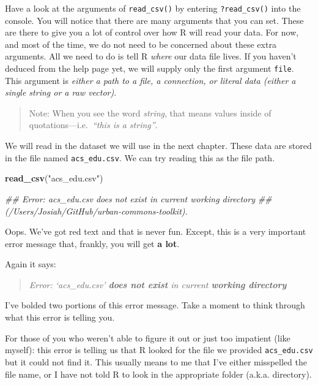 \documentclass[
]{book}
\newenvironment{Shaded}{\begin{snugshade}}{\end{snugshade}}
\newcommand{\CommentTok}[1]{\textcolor[rgb]{0.56,0.35,0.01}{\textit{#1}}}
\newcommand{\KeywordTok}[1]{\textcolor[rgb]{0.13,0.29,0.53}{\textbf{#1}}}
\newcommand{\NormalTok}[1]{#1}
\newcommand{\StringTok}[1]{\textcolor[rgb]{0.31,0.60,0.02}{#1}}
\begin{document}
Have a look at the arguments of \texttt{read\_csv()} by entering \texttt{?read\_csv()} into the console. You will notice that there are many arguments that you can set. These are there to give you a lot of control over how R will read your data. For now, and most of the time, we do not need to be concerned about these extra arguments. All we need to do is tell R \emph{where} our data file lives. If you haven't deduced from the help page yet, we will supply only the first argument \texttt{file}. This argument is \emph{either a path to a file, a connection, or literal data (either a single string or a raw vector)}.

\begin{quote}
Note: When you see the word \emph{string}, that means values inside of quotations---i.e.~\emph{``this is a string''}.
\end{quote}

We will read in the dataset we will use in the next chapter. These data are stored in the file named \texttt{acs\_edu.csv}. We can try reading this as the file path.

\begin{Shaded}
\begin{Highlighting}[]
\KeywordTok{read\_csv}\NormalTok{(}\StringTok{"acs\_edu.csv"}\NormalTok{)}

\CommentTok{\#\# Error: \textquotesingle{}acs\_edu.csv\textquotesingle{} does not exist in current working directory }
\CommentTok{\#\#   (\textquotesingle{}/Users/Josiah/GitHub/urban{-}commons{-}toolkit\textquotesingle{}).}
\end{Highlighting}
\end{Shaded}

Oops. We've got red text and that is never fun. Except, this is a very important error message that, frankly, you will get \textbf{a lot}.

Again it says:

\begin{quote}
\emph{Error: `acs\_edu.csv' \textbf{does not exist} in current \textbf{working directory}}
\end{quote}

I've bolded two portions of this error message. Take a moment to think through what this error is telling you.

For those of you who weren't able to figure it out or just too impatient (like myself): this error is telling us that R looked for the file we provided \texttt{acs\_edu.csv} but it could not find it. This usually means to me that I've either misspelled the file name, or I have not told R to look in the appropriate folder (a.k.a. directory).
\end{document}

